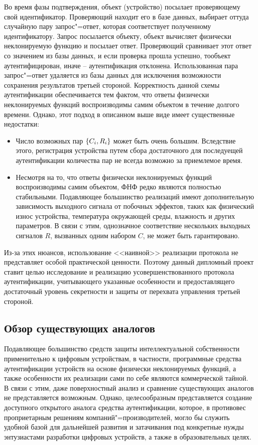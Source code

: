 Во время фазы подтверждения, объект (устройство) посылает проверяющему свой идентификатор. Проверяющий находит его в базе данных, выбирает оттуда случайную пару запрос"=ответ, которая соответствует полученному идентификатору. Запрос посылается объекту, объект вычисляет физически неклонируемую функцию и посылает ответ. Проверяющий сравнивает этот ответ со значением из базы данных, и если проверка прошла успешно, тообъект аутентифицирован, иначе -- аутентификация отклонена. Использованная пара запрос"=ответ удаляется из базы данных для исключения возможности сохранения результатов третьей стороной. Корректность данной схемы аутентификации обеспечивается тем фактом, что ответы физически неклонируемых функций воспроизводимы самим объектом в течение долгого времени.
Однако, этот подход в описанном выше виде имеет существенные недостатки:
\begin{itemize}
  \item Число возможных пар $ \left\{C_i, R_i\right\} $ может быть очень большим. Вследствие этого, регистрация устройства путем сбора достаточного для последуещей аутентификации количества пар не всегда возможно за приемлемое время.
  \item Несмотря на то, что ответы физически неклонируемых функций воспроизводимы самим объектом, ФНФ редко являются полностью стабильными. Подавляющее большинство реализаций имеют дополнительную зависимость выходного сигнала от побочных эффектов, таких как физический износ устройства, температура окружающей среды, влажность и других параметров. В связи с этим, однозначное соответствие нескольких выходных сигналов $ R $, вызванных одним набором $ C $, не может быть гарантировано.
\end{itemize}
Из-за этих нюансов, использование <<наивной>> реализации протокола не представляет особой практической ценности. Поэтому данный дипломный проект ставит целью исследование и реализацию усовершенствованного протокола аутентификации, учитывающего указанные особенности и предоставлящего достаточный уровень секретности и защиты от перехвата управления третьей стороной.


\subsection{Обзор существующих аналогов}
Подавляющее большинство средств защиты интеллектуальной собственности применительно к цифровым устройствам, в частности, программные средства аутентификации устройств на основе физически неклонируемых функций, а также особенности их реализации сами по себе являются коммерческой тайной. В связи с этим, даже поверхностный анализ и сравнение существующих аналогов не представляется возможным. Однако, целесообразным представляется создание доступного открытого аналога средства аутентификации, которое, в противовес проприетарным решениям компаний"=производителей, могло бы служить удобной базой для дальнейшей развития и затачивания под конкретные нужды энтузиастами разработки цифровых устройств, а также в образовательных целях.


